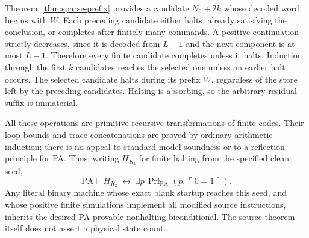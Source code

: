 Theorem~\ref{thm:sparse-prefix} provides a candidate $N_0+2k$ whose decoded
word begins with $W$. Each preceding candidate either halts, already
satisfying the conclusion, or completes after finitely many commands.
A positive continuation strictly decreases, since it is decoded from
$L-1$ and the next component is at most $L-1$. Therefore every finite
candidate completes unless it halts. Induction through the first $k$
candidates reaches the selected one unless an earlier halt occurs.
The selected candidate halts during its prefix $W$, regardless of the
store left by the preceding candidates. Halting is absorbing, so the
arbitrary residual suffix is immaterial.

All these operations are primitive-recursive transformations of finite
codes. Their loop bounds and trace concatenations are proved by ordinary
arithmetic induction; there is no appeal to standard-model soundness or
to a reflection principle for PA. Thus, writing $H_{R_2}$ for finite
halting from the specified clean seed,
\[
       \mathrm{PA}\vdash
       H_{R_2}\;\longleftrightarrow\;
       \exists p\,\operatorname{Prf}_{\mathrm{PA}}
                    (p,\ulcorner0=1\urcorner).
\]
Any literal binary machine whose exact blank startup reaches this seed,
and whose positive finite simulations implement all modified source
instructions, inherits the desired PA-provable nonhalting biconditional.
The source theorem itself does not assert a physical state count.
